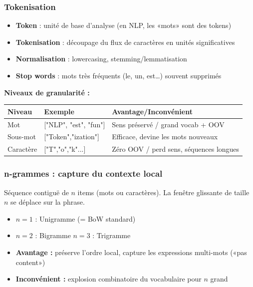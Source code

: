 \documentclass[a4paper,10pt]{article}
\begin{document}
\subsubsection{Tokenisation}
\begin{itemize}
  \item \textbf{Token} : unité de base d'analyse (en NLP, les «mots» sont des tokens)
  \item \textbf{Tokenisation} : découpage du flux de caractères en unités significatives
  \item \textbf{Normalisation} : lowercasing, stemming/lemmatisation
  \item \textbf{Stop words} : mots très fréquents (le, un, est…) souvent supprimés
\end{itemize}

\textbf{Niveaux de granularité :}
\begin{center}
\begin{tabular}{lll}
\toprule
\textbf{Niveau} & \textbf{Exemple} & \textbf{Avantage/Inconvénient} \\
\midrule
Mot & ["NLP", "est", "fun"] & Sens préservé / grand vocab + OOV \\
Sous-mot & ["Token","ization"] & Efficace, devine les mots nouveaux \\
Caractère & ["T","o","k"...] & Zéro OOV / perd sens, séquences longues \\
\bottomrule
\end{tabular}
\end{center}

\subsubsection{n-grammes : capture du contexte local}
\begin{definitionbox}[$n$-grammes]
Séquence contiguë de $n$ items (mots ou caractères). La fenêtre glissante de taille $n$ se déplace sur la phrase.
\begin{itemize}
  \item $n=1$ : Unigramme (= BoW standard)
  \item $n=2$ : Bigramme \quad $n=3$ : Trigramme
  \item \textbf{Avantage :} préserve l'ordre local, capture les expressions multi-mots («pas content»)
  \item \textbf{Inconvénient :} explosion combinatoire du vocabulaire pour $n$ grand
\end{itemize}
\end{definitionbox}
\end{document}

